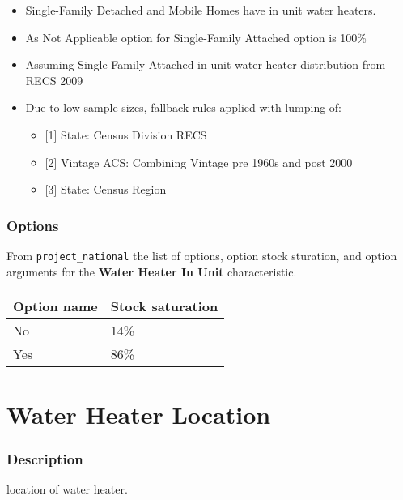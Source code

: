 \begin{itemize}
 
\item
  Single-Family Detached and Mobile Homes have in unit water heaters.
\item
  As Not Applicable option for Single-Family Attached option is 100\%
\item
  Assuming Single-Family Attached in-unit water heater distribution from
  RECS 2009
\item
  Due to low sample sizes, fallback rules applied with lumping of:

  \begin{itemize}
   
  \item
    {[}1{]} State: Census Division RECS
  \item
    {[}2{]} Vintage ACS: Combining Vintage pre 1960s and post 2000
  \item
    {[}3{]} State: Census Region
  \end{itemize}
\end{itemize}

\subsubsection{Options}\label{options-151}

From \texttt{project\_national} the list of options, option stock
sturation, and option arguments for the \textbf{Water Heater In Unit}
characteristic.

\begin{longtable}[]{@{}ll@{}}
\toprule\noalign{}
Option name & Stock saturation \\
\midrule\noalign{}
\endhead
\bottomrule\noalign{}
\endlastfoot
No & 14\% \\
Yes & 86\% \\
\end{longtable}

\section{Water Heater Location}\label{water_heater_location}

\subsubsection{Description}\label{description-148}

location of water heater.

